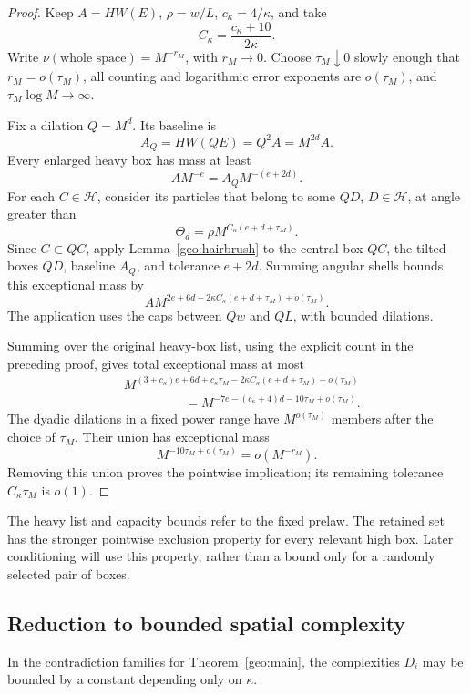 \begin{proof}
Keep \(A=HW(E)\), \(\rho=w/L\), \(c_\kappa=4/\kappa\), and take
\[
C_\kappa=\frac{c_\kappa+10}{2\kappa}.
\]
Write \(\nu(\text{whole space})=M^{-r_M}\), with \(r_M\to0\).
Choose \(\tau_M\downarrow0\) slowly enough that
\(r_M=o(\tau_M)\), all counting and logarithmic error exponents
are \(o(\tau_M)\), and \(\tau_M\log M\to\infty\).

Fix a dilation \(Q=M^d\).  Its baseline is
\[
A_Q=HW(QE)=Q^2A=M^{2d}A.
\]
Every enlarged heavy box has mass at least
\[
AM^{-e}=A_QM^{-(e+2d)}.
\]
For each \(C\in\mathcal H\), consider its particles that belong
to some \(QD\), \(D\in\mathcal H\), at angle greater than
\[
\Theta_d=\rho M^{C_\kappa(e+d+\tau_M)}.
\]
Since \(C\subset QC\), apply Lemma~\ref{geo:hairbrush} to the
central box \(QC\), the tilted boxes \(QD\), baseline \(A_Q\),
and tolerance \(e+2d\).  Summing angular shells bounds this
exceptional mass by
\[
A M^{2e+6d-2\kappa C_\kappa(e+d+\tau_M)+o(\tau_M)}.
\]
The application uses the caps between \(Qw\) and \(QL\), with
bounded dilations.

Summing over the original heavy-box list, using the explicit
count in the preceding proof, gives total exceptional mass at
most
\[
\begin{split}
&M^{(3+c_\kappa)e+6d+c_\kappa\tau_M
       -2\kappa C_\kappa(e+d+\tau_M)+o(\tau_M)}\\
&\hspace{2cm}
=M^{-7e-(c_\kappa+4)d-10\tau_M+o(\tau_M)}.
\end{split}
\]
The dyadic dilations in a fixed power range have
\(M^{o(\tau_M)}\) members after the choice of \(\tau_M\).  Their
union has exceptional mass
\[
M^{-10\tau_M+o(\tau_M)}
=o(M^{-r_M}).
\]
Removing this union proves the pointwise implication; its
remaining tolerance \(C_\kappa\tau_M\) is \(o(1)\).
\end{proof}

The heavy list and capacity bounds refer to the fixed prelaw.
The retained set has the stronger pointwise exclusion property for
every relevant high box.  Later conditioning will use this property,
rather than a bound only for a randomly selected pair of boxes.

\subsection{Reduction to bounded spatial complexity}

\begin{lemma}\label{geo:bounded-complexity}
In the contradiction families for Theorem~\ref{geo:main}, the
complexities \(D_i\) may be bounded by a constant depending only
on \(\kappa\).
\end{lemma}

